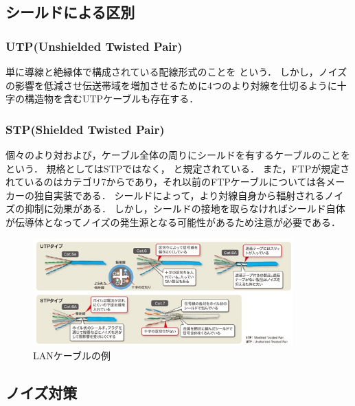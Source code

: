 \documentclass[a4paper]{ltjsarticle}
\begin{document}
\subsection{シールドによる区別}\label{ux30b7ux30fcux30ebux30c9ux306bux3088ux308bux533aux5225}

\subsubsection{UTP(Unshielded Twisted
Pair)}\label{utpunshielded-twisted-pair}

単に導線と絶縁体で構成されている配線形式のことを
 という．
しかし，ノイズの影響を低減させ伝送帯域を増加させるために4つのより対線を仕切るように十字の構造物を含むUTPケーブルも存在する．

\subsubsection{STP(Shielded Twisted
Pair)}\label{stpshielded-twisted-pair}

個々のより対および，ケーブル全体の周りにシールドを有するケーブルのことを
 という．
規格としてはSTPではなく， 
と規定されている．
また，FTPが規定されているのはカテゴリ7からであり，それ以前のFTPケーブルについては各メーカーの独自実装である．
シールドによって，より対線自身から輻射されるノイズの抑制に効果がある．
しかし，シールドの接地を取らなければシールド自体が伝導体となってノイズの発生源となる可能性があるため注意が必要である．

\begin{figure}[H]
  \centering
  \includegraphics[width=10cm]{lancable.jpg}
  \caption{LANケーブルの例\cite{2}}
\end{figure}

\subsection{ノイズ対策}\label{ux30ceux30a4ux30baux5bfeux7b56}
\end{document}
